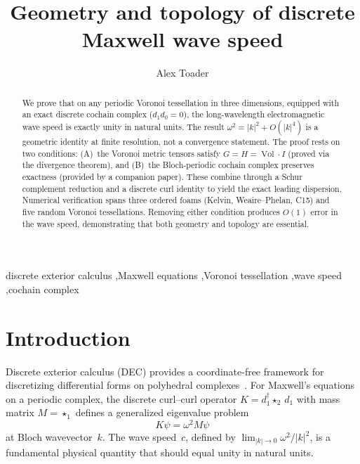 \documentclass[preprint,12pt]{elsarticle}
\DeclareMathOperator{\Vol}{Vol}
\begin{document}
\begin{frontmatter}
\title{Geometry and topology of discrete Maxwell wave speed}
\author{Alex Toader}
\address{Independent researcher}

\begin{abstract}
We prove that on any periodic Voronoi tessellation in three dimensions,
equipped with an exact discrete cochain complex ($d_1 d_0 = 0$), the
long-wavelength electromagnetic wave speed is exactly unity in natural
units. The result $\omega^2 = |k|^2 + O(|k|^4)$ is a geometric identity
at finite resolution, not a convergence statement. The proof rests on two
conditions: (A)~the Voronoi metric tensors satisfy
$G = H = \Vol \cdot I$ (proved via the divergence theorem), and (B)~the
Bloch-periodic cochain complex preserves exactness (provided by a companion
paper). These combine through a Schur complement reduction and a discrete
curl identity to yield the exact leading dispersion. Numerical verification
spans three ordered foams (Kelvin, Weaire--Phelan, C15) and five random
Voronoi tessellations. Removing either condition produces $O(1)$ error in
the wave speed, demonstrating that both geometry and topology are essential.
\end{abstract}

\begin{keyword}
discrete exterior calculus \sep Maxwell equations \sep Voronoi tessellation
\sep wave speed \sep cochain complex
\end{keyword}
\end{frontmatter}


\section{Introduction}
\label{sec:intro}

Discrete exterior calculus (DEC) provides a coordinate-free framework for
discretizing differential forms on polyhedral
complexes~\cite{hirani2003,desbrun2005,arnold2006}. For Maxwell's equations
on a periodic complex, the discrete curl--curl operator
$K = d_1^\dagger \star_2 \, d_1$ with mass matrix $M = \star_1$ defines a
generalized eigenvalue problem
\begin{equation}
  K \psi = \omega^2 M \psi
  \label{eq:eigenvalue}
\end{equation}
at Bloch wavevector~$k$. The wave speed~$c$, defined by
$\lim_{|k|\to 0} \omega^2/|k|^2$, is a fundamental physical quantity that
should equal unity in natural units.
\end{document}
